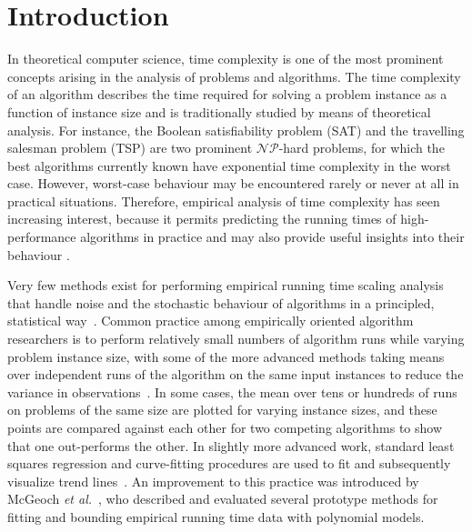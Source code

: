 \documentclass[aic]{iosart2x}
\newcommand{\etal}{\emph{et al.}}
\begin{document}


\section{Introduction}
In theoretical computer science, time complexity is one of the most
prominent concepts arising in the analysis of problems and algorithms.
The time complexity of an algorithm describes the time required for
solving a problem instance as a function of instance size and is traditionally
studied by means of theoretical analysis. For instance, the
Boolean satisfiability problem (SAT) and the travelling salesman problem
(TSP) are two prominent $\mathcal{NP}$-hard problems, for which the best algorithms
currently known have exponential time complexity in the worst case. 
However, worst-case behaviour may be encountered rarely or never at all in practical 
situations.
Therefore, empirical analysis of time complexity has seen increasing interest, because it permits
predicting the running times of high-performance algorithms in practice
and may also provide useful insights into their behaviour \cite{Kun02,SubDes05,AguEtAl07}.


Very few methods exist for performing empirical running time scaling analysis that handle noise and the stochastic behaviour of algorithms in a principled, statistical way~\cite{Hoo09}. 
Common practice among empirically oriented algorithm researchers is to perform relatively small numbers of algorithm runs while varying problem instance size, with some of the more advanced methods taking means over independent runs of the algorithm on the same input instances to reduce the variance in observations~\cite{Sun09}. 
In some cases, the mean over tens or hundreds of runs on problems of the same size are plotted for varying instance sizes, and these points are compared against each other for two competing algorithms to show that one out-performs the other. 
In slightly more advanced work, standard least squares regression and curve-fitting procedures are used to fit and subsequently visualize  trend lines~\cite{ZapHau12}. 
An improvement to this practice was introduced by McGeoch \etal~\cite{McgEtAl02}, who described and evaluated several prototype methods for fitting and bounding empirical running time data with polynomial models. 
\end{document}
